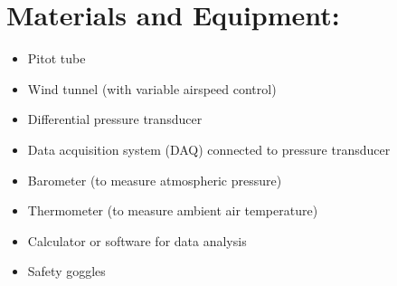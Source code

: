 \documentclass[12pt]{article}
\begin{document}
\section{Materials and Equipment:} 
\begin{itemize}
\item Pitot tube
\item Wind tunnel (with variable airspeed control)
\item Differential pressure transducer
\item Data acquisition system (DAQ) connected to pressure transducer
\item Barometer (to measure atmospheric pressure)
\item Thermometer (to measure ambient air temperature)
\item Calculator or software for data analysis
\item Safety goggles
\end{itemize}
\clearpage
\end{document}
